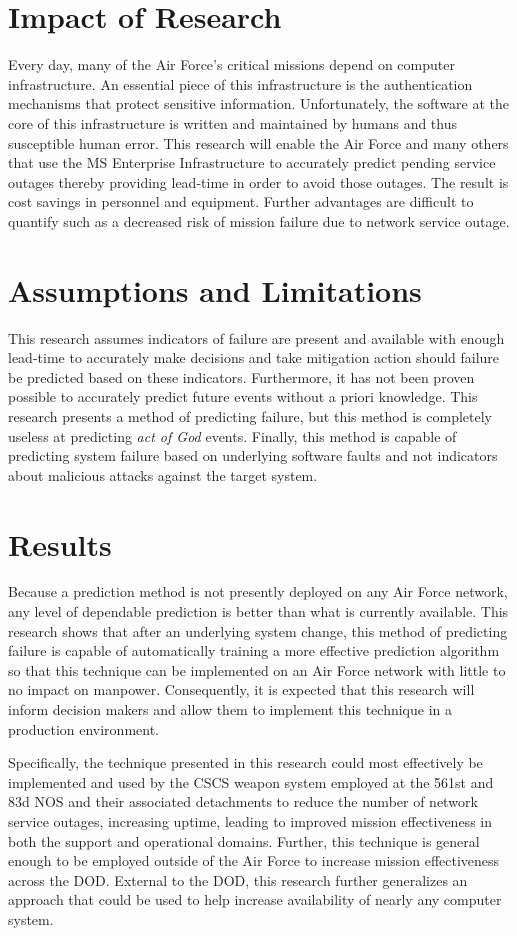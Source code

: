 \section{Impact of Research}
Every day, many of the Air Force's critical missions depend on computer
infrastructure.  An essential piece of this infrastructure is the
authentication mechanisms that protect  sensitive information.  Unfortunately,
the software at the core of this infrastructure is written and maintained by
humans and thus susceptible human error.  This research will enable the Air
Force and many others that use the \ac{MS} Enterprise Infrastructure to
accurately predict pending service outages thereby providing lead-time in order
to avoid those outages.  The result is cost savings in personnel and equipment.
Further advantages are difficult to quantify such as a decreased risk of
mission failure due to network service outage.

\section{Assumptions and Limitations}
This research assumes indicators of failure are present and available with
enough lead-time to accurately make decisions and take mitigation action should
failure be predicted based on these indicators.  Furthermore, it has not been
proven possible to accurately predict future events without a priori knowledge.
This research presents a method of predicting failure, but this method is
completely useless at predicting \emph{act of God} events.  Finally, this
method is capable of predicting system failure based on underlying software
faults and not indicators about malicious attacks against the target system.

\section{Results}
Because a prediction method is not presently deployed on any Air Force network,
any level of dependable prediction is better than what is currently
available.  This research shows that after an underlying system change, this
method of predicting failure is capable of automatically training a more
effective prediction algorithm so that this technique can be implemented on an
Air Force network with little to no impact on manpower.  Consequently, it is
expected that this research will inform decision makers and allow them to
implement this technique in a production environment.

Specifically, the technique presented in this research could most effectively
be implemented and used by the \ac{CSCS} weapon system employed at the 561st
and 83d \ac{NOS} and their associated detachments to reduce the number of
network service outages, increasing uptime, leading to improved mission
effectiveness in both the support and operational domains.  Further, this
technique is general enough to be employed outside of the Air Force to increase
mission effectiveness across the \ac{DOD}.  External to the \ac{DOD}, this
research further generalizes an approach that could be used to help increase
availability of nearly any computer system.
